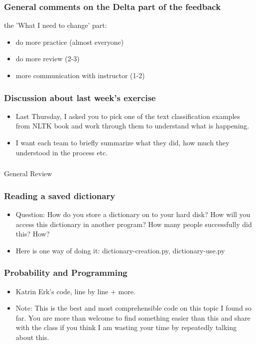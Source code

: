 \documentclass{beamer}
\begin{document}
\begin{frame}
\frametitle{General comments on the Delta part of the feedback}
the 'What I need to change' part:
\begin{itemize}
\item do more practice (almost everyone)
\item do more review (2-3)
\item more communication with instructor (1-2)
\end{itemize}
\end{frame}

\begin{frame}
\frametitle{Discussion about last week's exercise}
\begin{itemize}
\item Last Thursday, I asked you to pick one of the text classification examples from NLTK book and work through them to understand what is happening.
\item I want each team to briefly summarize what they did, how much they understood in the process etc.
\end{itemize}
\end{frame}

\begin{frame}
\frametitle{}
\Large General Review
\end{frame}

\begin{frame} %
\frametitle{Reading a saved dictionary}
\begin{itemize}
\item Question: How do you store a dictionary on to your hard disk? How will you access this dictionary in another program? How many people successfully did this? How?\pause
\item Here is one way of doing it: dictionary-creation.py, dictionary-use.py
\end{itemize}
\end{frame}

\begin{frame} %
\frametitle{Probability and Programming}
\begin{itemize}
\item Katrin Erk's code, line by line + more.
\item Note: This is the best and most comprehensible code on this topic I found so far. You are more than welcome to find something easier than this and share with the class if you think I am wasting your time by repeatedly talking about this. 
\end{itemize}
\end{frame}
\end{document}
